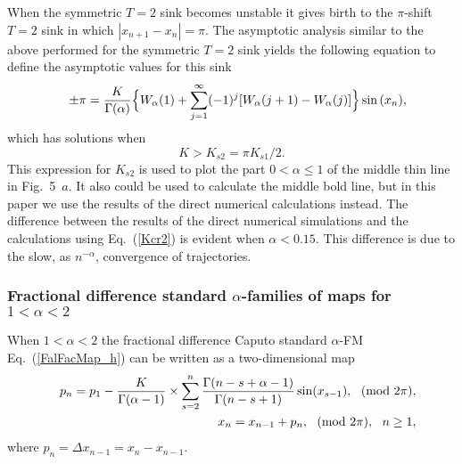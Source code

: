 \documentclass[graybox]{svmult}
\begin{document}
When the symmetric $T=2$ sink becomes unstable it gives birth to
the $\pi$-shift $T=2$ sink in which $|x_{n+1}-x_{n}|=\pi$. The asymptotic analysis similar to the above performed for the symmetric $T=2$ sink yields the following equation to define the asymptotic values for this sink
{\setlength\arraycolsep{0.5pt}   
\begin{eqnarray} 
&&\pm \pi=\frac{K}{\Gamma(\alpha)}\Bigl\{
  W_{\alpha}(1) +\sum^{\infty}_{j=1} (-1)^j[W_{\alpha}(j+1)-W_{\alpha}(j)]\Bigr\}\sin{(x_n)},
\label{1_2DSinMapsD2} 
\end{eqnarray}
}
which has solutions when
\begin{equation} 
K>K_{s2}=\pi K_{s1}/2.
\label{Kcr2}
\end{equation}
This expression for $K_{s2}$ is used to plot the part $0<\alpha \le1$ of the middle thin line in 
Fig.~5~$a$.
It also could be used to calculate the middle bold line, but in this paper we use the results of the direct numerical calculations \cite{ME8} instead. The difference between the results of the direct numerical simulations and the calculations using Eq.~(\ref{Kcr2}) is evident when $\alpha < 0.15$.
This difference is due to the slow, as $n^{-\alpha}$,
convergence of trajectories. 

 
 
\subsubsection{Fractional difference standard $\alpha$-families of maps for $1<\alpha<2$}

When $1<\alpha<2$ the fractional difference Caputo standard 
$\alpha$-FM Eq.~(\ref{FalFacMap_h}) can be written as a 
two-dimensional map \cite{ME8}
{\setlength\arraycolsep{0.5pt}   
\begin{eqnarray} 
&&p_{n} =  p_1 -\frac{K}{\Gamma(\alpha-1)}
\times \sum^{n}_{s=2}\frac{\Gamma(n-s+\alpha-1)}
{\Gamma(n-s+1)}\sin (x_{s-1}) 
, \ \ ({\rm mod} \ 2\pi ),
\label{SMgt1p} \\
&& x_n=x_{n-1}+p_n, \ \ ({\rm mod} \ 2\pi ),  \ \ n \ge 1,
\label{SMgt1x}
\end{eqnarray}
}
where $p_n=\Delta x_{n-1}=x_n-x_{n-1}$.
 
\end{document}
